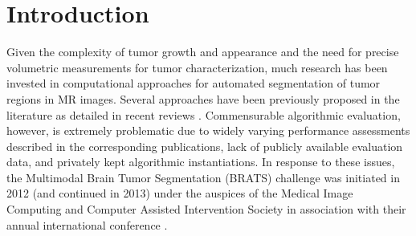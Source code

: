 \documentclass[preprint,authoryear,review,12pt]{elsarticle}
\begin{document}
%
%
\newpage







%
%
%


%
%

\section{Introduction}
Given the complexity of tumor growth and appearance and the need
for precise volumetric measurements for tumor characterization, 
much research has been invested in computational approaches for 
automated segmentation of tumor regions in MR images.  Several 
approaches have been previously proposed in the literature as
detailed in recent reviews \citep{angelini2007,bauer2013}.  
Commensurable algorithmic evaluation, however, is
extremely problematic due to widely varying performance assessments
described in the corresponding publications, lack of publicly available 
evaluation data, and privately kept algorithmic instantiations.  
In response to these issues, the Multimodal Brain Tumor Segmentation 
(BRATS) challenge was initiated in 2012 (and continued in 2013) under 
the auspices of the Medical Image Computing and Computer Assisted 
Intervention Society in association with their annual international 
conference \citep{menze2014}.
\end{document}
